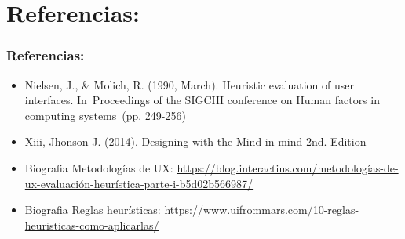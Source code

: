 \documentclass[11pt]{beamer}
\begin{document}
\section{Referencias:}
\begin{frame}
\frametitle{Referencias:}
\begin{itemize}
\item Nielsen, J., & Molich, R. (1990, March). Heuristic evaluation of user interfaces. In Proceedings of the SIGCHI conference on Human factors in computing systems (pp. 249-256)
\item Xiii, Jhonson J. (2014). Designing with the Mind in mind 2nd. Edition
\item Biografia Metodologías de UX: \url{https://blog.interactius.com/metodologías-de-ux-evaluación-heurística-parte-i-b5d02b566987/}
\item Biografia Reglas heurísticas: \url{https://www.uifrommars.com/10-reglas-heuristicas-como-aplicarlas/}
\end{itemize}
\end{frame}
\end{document}
